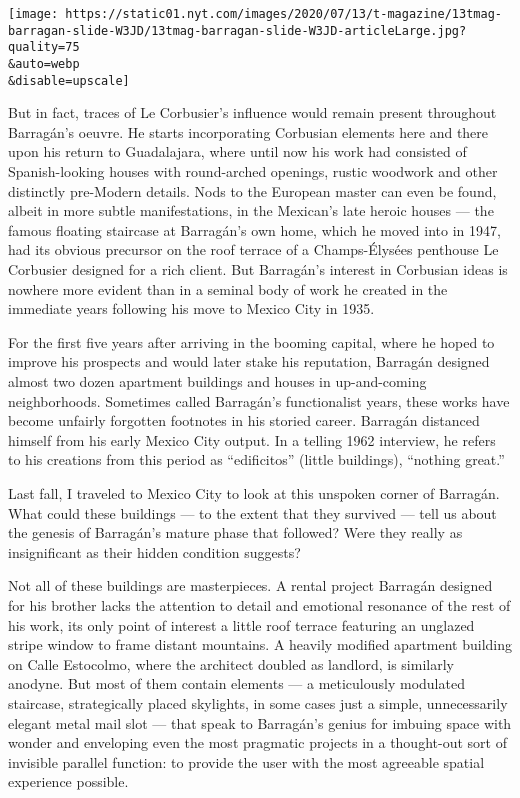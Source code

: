 \texttt{[image: https://static01.nyt.com/images/2020/07/13/t-magazine/13tmag-barragan-slide-W3JD/13tmag-barragan-slide-W3JD-articleLarge.jpg?quality=75\\\&auto=webp\\\&disable=upscale]}

But in fact, traces of Le Corbusier's influence would remain present
throughout Barragán's oeuvre. He starts incorporating Corbusian elements
here and there upon his return to Guadalajara, where until now his work
had consisted of Spanish-looking houses with round-arched openings,
rustic woodwork and other distinctly pre-Modern details. Nods to the
European master can even be found, albeit in more subtle manifestations,
in the Mexican's late heroic houses --- the famous floating staircase at
Barragán's own home, which he moved into in 1947, had its obvious
precursor on the roof terrace of a Champs-Élysées penthouse Le Corbusier
designed for a rich client. But Barragán's interest in Corbusian ideas
is nowhere more evident than in a seminal body of work he created in the
immediate years following his move to Mexico City in 1935.

For the first five years after arriving in the booming capital, where he
hoped to improve his prospects and would later stake his reputation,
Barragán designed almost two dozen apartment buildings and houses in
up-and-coming neighborhoods. Sometimes called Barragán's functionalist
years, these works have become unfairly forgotten footnotes in his
storied career. Barragán distanced himself from his early Mexico City
output. In a telling 1962 interview, he refers to his creations from
this period as ``edificitos'' (little buildings), ``nothing great.''

Last fall, I traveled to Mexico City to look at this unspoken corner of
Barragán. What could these buildings --- to the extent that they
survived --- tell us about the genesis of Barragán's mature phase that
followed? Were they really as insignificant as their hidden condition
suggests?

Not all of these buildings are masterpieces. A rental project Barragán
designed for his brother lacks the attention to detail and emotional
resonance of the rest of his work, its only point of interest a little
roof terrace featuring an unglazed stripe window to frame distant
mountains. A heavily modified apartment building on Calle Estocolmo,
where the architect doubled as landlord, is similarly anodyne. But most
of them contain elements --- a meticulously modulated staircase,
strategically placed skylights, in some cases just a simple,
unnecessarily elegant metal mail slot --- that speak to Barragán's
genius for imbuing space with wonder and enveloping even the most
pragmatic projects in a thought-out sort of invisible parallel function:
to provide the user with the most agreeable spatial experience possible.


